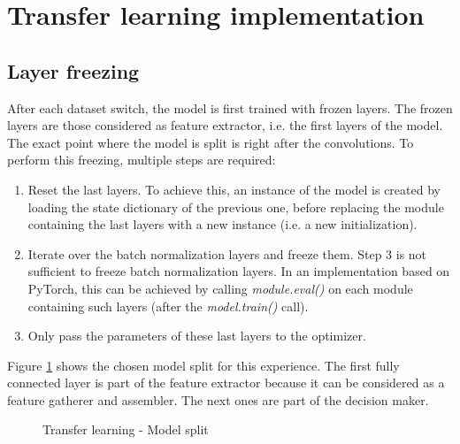 \section{Transfer learning implementation}
\subsection{Layer freezing}
\setlength{\marginparwidth}{3cm}\leavevmode {}After each dataset switch, the model is first trained with frozen layers. The frozen layers are those considered as feature extractor, i.e. the first layers of the model. The exact point where the model is split is right after the convolutions. To perform this freezing, multiple steps are required:
\begin{enumerate}
	\item Reset the last layers. To achieve this, an instance of the model is created by loading the state dictionary of the previous one, before replacing the module containing the last layers with a new instance (i.e. a new initialization). 
	\item Iterate over the batch normalization layers and freeze them. Step 3 is not sufficient to freeze batch normalization layers. In an implementation based on PyTorch, this can be achieved by calling \textit{module.eval()} on each module containing such layers (after the \textit{model.train()} call). 
	\item Only pass the parameters of these last layers to the optimizer.
\end{enumerate}

\noindent Figure \ref{fig:tl_model_split} shows the chosen model split for this experience. The first fully connected layer is part of the feature extractor because it can be considered as a feature gatherer and assembler. The next ones are part of the decision maker. 

\begin{figure}[!h]
\centering
\noindent
{}
\caption{Transfer learning - Model split}
\label{fig:tl_model_split}
\end{figure}

